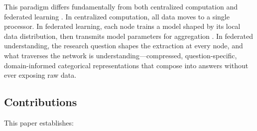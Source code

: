 \documentclass[10pt,twocolumn]{article}
\theoremstyle{definition}
\theoremstyle{remark}
\begin{document}
This paradigm differs fundamentally from both centralized computation and federated learning \cite{mcmahan2017}. In centralized computation, all data moves to a single processor. In federated learning, each node trains a model shaped by its local data distribution, then transmits model parameters for aggregation \cite{kairouz2021,li2020federated}. In federated understanding, the research question shapes the extraction at every node, and what traverses the network is understanding---compressed, question-specific, domain-informed categorical representations that compose into answers without ever exposing raw data.

\subsection{Contributions}

This paper establishes:
\end{document}
